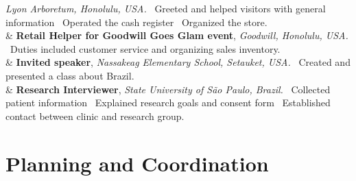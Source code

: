 \documentclass[11pt, a4paper]{article}
\newcommand{\Year}[1]{\fontsize{10pt}{0}\selectfont #1}
\begin{document}
\begin{EntriesTable}
	\newline
	\textit{Lyon Arboretum, Honolulu, USA.}
	\newline
	\textbullet \ Greeted and helped visitors with general information
	\textbullet \ Operated the cash register
	\textbullet \ Organized the store.
	\\
	\Year{2018}  &
	\textbf{Retail Helper for Goodwill Goes Glam event},
	\newline
	\textit{Goodwill, Honolulu, USA.}
	\newline
	\textbullet \ Duties included customer service and organizing sales inventory.
	\\
	\Year{2017}  &
	\textbf{Invited speaker},
	\newline
	\textit{Nassakeag Elementary School, Setauket, USA.}
	\newline
	\textbullet \ Created and presented a class about Brazil.
	\\
	\Year{2009}  &
	\textbf{Research Interviewer},
	\newline
	\textit{State University of São Paulo, Brazil.}
	\newline
	\textbullet \ Collected patient information
	\textbullet \ Explained research goals and consent form
	\textbullet \ Established contact between clinic and research group.
	\\

\end{EntriesTable}

\section*{Planning and Coordination}
\end{document}

